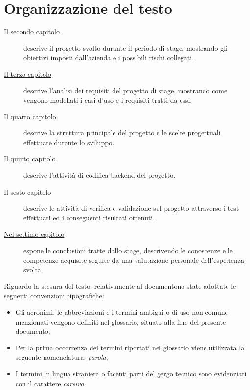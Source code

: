 \section{Organizzazione del testo}

\begin{description}
      \item[{\hyperref[cap:descrizione-stage]{Il secondo capitolo}}] descrive
            il progetto svolto durante il periodo di stage, mostrando gli
            obiettivi imposti dall'azienda e i possibili rischi collegati.

      \item[{\hyperref[cap:analisi-requisiti]{Il terzo capitolo}}] descrive
            l'analisi dei requisiti del progetto di stage, mostrando come vengono
            modellati i casi d'uso e i requisiti tratti da essi.

      \item[{\hyperref[cap:struttura-progettazione]{Il quarto capitolo}}] descrive
            la struttura principale del progetto e le scelte progettuali effettuate
            durante lo sviluppo.

      \item[{\hyperref[cap:codifica]{Il quinto capitolo}}] descrive l'attività di
            codifica backend del progetto.

      \item[{\hyperref[cap:verifica-validazione]{Il sesto capitolo}}] descrive le
            attività di verifica e validazione sul progetto attraverso i test effettuati
            ed i conseguenti risultati ottenuti.

      \item[{\hyperref[cap:conclusioni]{Nel settimo capitolo}}] espone le
            conclusioni tratte dallo stage, descrivendo le conoscenze e le competenze
            acquisite seguite da una valutazione personale dell'esperienza svolta.
\end{description}

Riguardo la stesura del testo, relativamente al documentono state adottate le seguenti convenzioni tipografiche:
\begin{itemize}
      \item Gli acronimi, le abbreviazioni e i termini ambigui o di uso non comune menzionati vengono definiti nel glossario, situato alla fine del presente documento;
      \item Per la prima occorrenza dei termini riportati nel glossario viene utilizzata la seguente nomenclatura: \glsfirstoccur\emph{parola};
      \item I termini in lingua straniera o facenti parti del gergo tecnico sono evidenziati con il carattere \emph{corsivo}.
\end{itemize}
